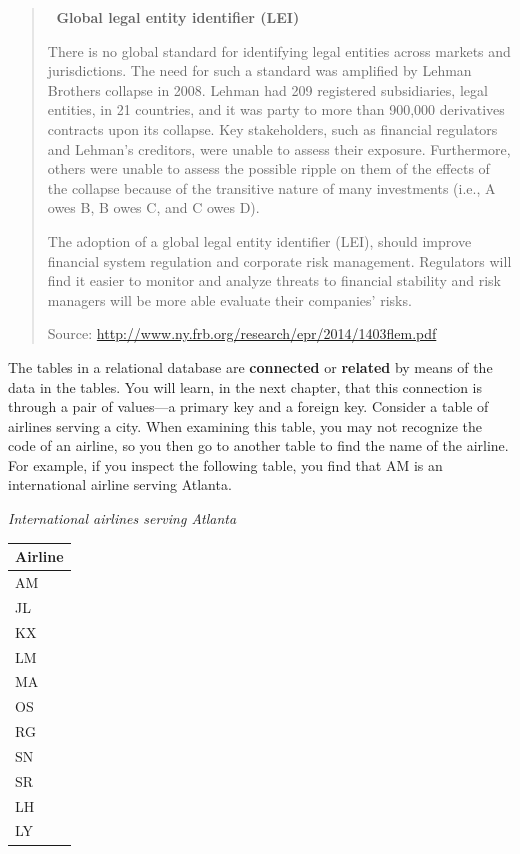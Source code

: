 \documentclass[
]{article}
\begin{document}
\begin{quote}
💠 \textbf{Global legal entity identifier (LEI)}

There is no global standard for identifying legal entities across markets and jurisdictions. The need for such a standard was amplified by Lehman Brothers collapse in 2008. Lehman had 209 registered subsidiaries, legal entities, in 21 countries, and it was party to more than 900,000 derivatives contracts upon its collapse. Key stakeholders, such as financial regulators and Lehman's creditors, were unable to assess their exposure. Furthermore, others were unable to assess the possible ripple on them of the effects of the collapse because of the transitive nature of many investments (i.e., A owes B, B owes C, and C owes D).

The adoption of a global legal entity identifier (LEI), should improve financial system regulation and corporate risk management. Regulators will find it easier to monitor and analyze threats to financial stability and risk managers will be more able evaluate their companies' risks.

Source: \url{http://www.ny.frb.org/research/epr/2014/1403flem.pdf}
\end{quote}

The tables in a relational database are \textbf{connected} or \textbf{related} by means of the data in the tables. You will learn, in the next chapter, that this connection is through a pair of values---a primary key and a foreign key. Consider a table of airlines serving a city. When examining this table, you may not recognize the code of an airline, so you then go to another table to find the name of the airline. For example, if you inspect the following table, you find that AM is an international airline serving Atlanta.

\emph{International airlines serving Atlanta}

\begin{longtable}[]{@{}l@{}}
\toprule
Airline \\
\midrule
\endhead
AM \\
JL \\
KX \\
LM \\
MA \\
OS \\
RG \\
SN \\
SR \\
LH \\
LY \\
\bottomrule
\end{longtable}
\end{document}

